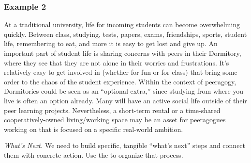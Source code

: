 \subsubsection*{Example 2}
At a traditional university, life for incoming students can become overwhelming quickly.  Between class, studying, tests, papers, exams, friendships, sports, student life, remembering to eat, and more it is easy to get lost and give up.  An important part of student life is sharing concerns with peers in their Dormitory, where they see that they are not alone in their worries and frustrations.  It's relatively easy to get involved in  (whether for fun or for class) that bring some order to the chaos of the student experience. Within the context of peeragogy, Dormitories could be seen as an ``optional extra,'' since studying
from where you live is often an option already.  Many will have an active social life outside of their peer learning projects. Nevertheless, a short-term rental or a time-shared cooperatively-owned living/working space may be an asset for peeragogues working on  that is focused on a specific real-world ambition.


\begin{framed}
\noindent 
\emph{What's Next.}
We need to build specific, tangible ``what's next'' steps and connect them with concrete action. Use the  to organize that process. 
\end{framed}

